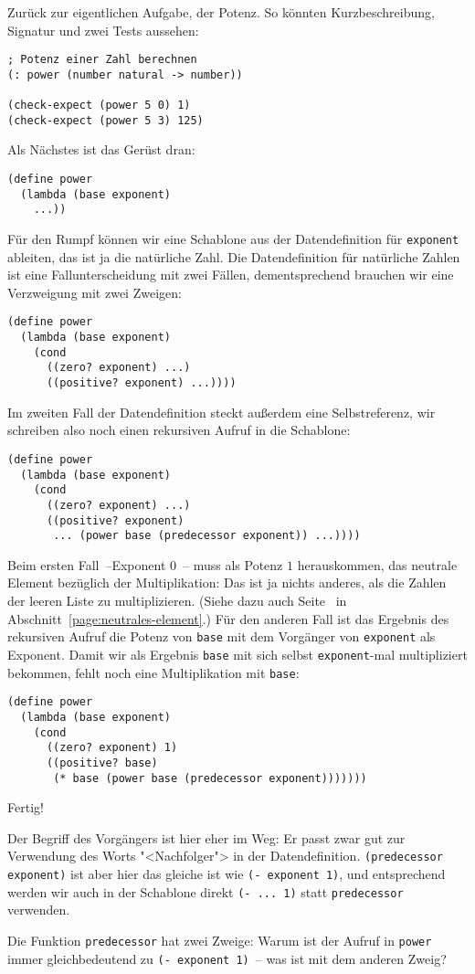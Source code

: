 Zurück zur eigentlichen Aufgabe, der Potenz.  So könnten
Kurzbeschreibung, Signatur und zwei Tests aussehen:\label{function:power}
%
\begin{lstlisting}
; Potenz einer Zahl berechnen
(: power (number natural -> number))

(check-expect (power 5 0) 1)
(check-expect (power 5 3) 125)
\end{lstlisting}
%
Als Nächstes ist das Gerüst dran:
%
\begin{lstlisting}
(define power
  (lambda (base exponent)
    ...))
\end{lstlisting}
%
Für den Rumpf können wir eine Schablone aus der Datendefinition
für \lstinline{exponent} ableiten, das ist ja die natürliche
Zahl.  Die Datendefinition für natürliche Zahlen ist eine
Fallunterscheidung mit zwei Fällen, dementsprechend brauchen wir eine
Verzweigung mit zwei Zweigen:
%
\begin{lstlisting}
(define power
  (lambda (base exponent)
    (cond
      ((zero? exponent) ...)
      ((positive? exponent) ...))))
\end{lstlisting}
%
Im zweiten Fall der Datendefinition steckt außerdem eine
Selbstreferenz, wir schreiben also noch einen rekursiven Aufruf in die
Schablone:
%
\begin{lstlisting}
(define power
  (lambda (base exponent)
    (cond
      ((zero? exponent) ...)
      ((positive? exponent)
       ... (power base (predecessor exponent)) ...))))
\end{lstlisting}
%
Beim ersten Fall~--Exponent $0$~-- muss als Potenz $1$ herauskommen, das
neutrale Element bezüglich der Multiplikation: Das ist ja nichts
anderes, als die Zahlen der leeren Liste zu multiplizieren.  (Siehe
dazu auch Seite~\pageref{page:neutrales-element} in
Abschnitt~\ref{page:neutrales-element}.)
Für den anderen Fall ist das Ergebnis des rekursiven Aufruf die Potenz
von \lstinline{base} mit dem Vorgänger von \lstinline{exponent} als
Exponent.  Damit wir als Ergebnis \lstinline{base} mit sich selbst
\lstinline{exponent}-mal multipliziert bekommen, fehlt noch eine
Multiplikation mit \lstinline{base}:
%
\begin{lstlisting}
(define power
  (lambda (base exponent)
    (cond
      ((zero? exponent) 1)
      ((positive? base)
       (* base (power base (predecessor exponent)))))))
\end{lstlisting}
%
Fertig!

Der Begriff des Vorgängers ist hier eher im Weg: Er passt zwar gut zur
Verwendung des Worts "<Nachfolger"> in der
Datendefinition. \lstinline{(predecessor exponent)} ist aber hier das
gleiche ist wie \lstinline{(- exponent 1)}, und entsprechend werden
wir auch in der Schablone direkt \lstinline{(- ... 1)} statt
\lstinline{predecessor} verwenden.
\begin{aufgabe}
  Die Funktion \lstinline{predecessor} hat zwei Zweige: Warum ist der
  Aufruf in \lstinline{power} immer gleichbedeutend zu
  \lstinline{(- exponent 1)}~-- was ist mit dem anderen Zweig?
\end{aufgabe}


